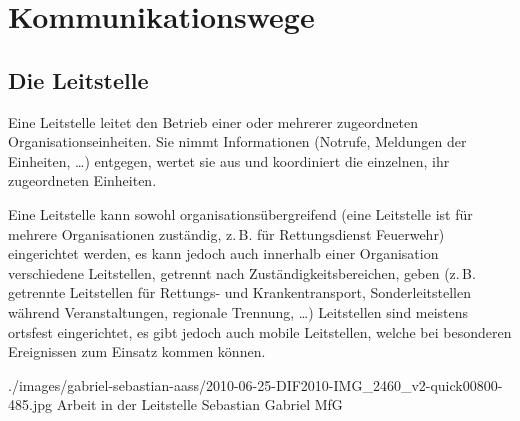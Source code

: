 \clearpage %
\section{Kommunikationswege}
\label{topic:kommunikationswege}

\subsection{Die Leitstelle}
\label{topic:leitstelle}


\TextSlidePicture
{\TxBeschreibung}%
{%
Eine Leitstelle leitet den
Betrieb einer oder mehrerer zugeordneten
Organisationseinheiten. Sie nimmt Informationen
(Notrufe, Meldungen der Einheiten, \ldots) entgegen, wertet
sie aus und koordiniert die einzelnen, ihr zugeordneten
Einheiten. 

Eine Leitstelle kann sowohl organisationsübergreifend (eine
Leitstelle ist für mehrere Organisationen zuständig,
z.\,B. für Rettungsdienst  Feuerwehr) eingerichtet
werden, es kann jedoch auch innerhalb einer Organisation
verschiedene Leitstellen, getrennt nach
Zuständigkeitsbereichen, geben (z.\,B. getrennte
Leitstellen für Rettungs- und Krankentransport,
Sonderleitstellen während Veranstaltungen, regionale
Trennung, \ldots)
Leitstellen sind meistens ortsfest eingerichtet, es
gibt jedoch auch mobile Leitstellen, welche bei besonderen
Ereignissen zum Einsatz kommen können.}%
{}%
{./images/gabriel-sebastian-aass/2010-06-25-DIF2010-IMG_2460_v2-quick00800-485.jpg}%
{Arbeit in der Leitstelle}%
{}%
{Sebastian Gabriel}%
{MfG}%

